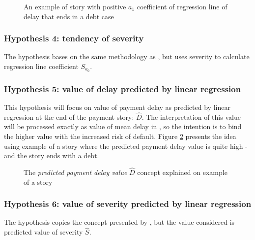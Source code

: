 \documentclass{article}
\begin{document}
\begin{figure}[htbp!]
    \begin{center}
        
    \caption{An example of story with positive $a_1$ coefficient of regression line of delay that ends in a debt case}
    \label{fig:303_h3_tendency_coefficient_explained}
    \end{center}
\end{figure}

\subsubsection{Hypothesis 4: tendency of severity}

The hypothesis bases on the same methodology as , but uses severity to calculate regression line coefficient $S_{a_0}$.

\subsubsection{Hypothesis 5: value of delay predicted by linear regression}
\label{section:H5}

This hypothesis will focus on value of payment delay as predicted by linear regression at the end of the payment story: $\hat{D}$.
The interpretation of this value will be processed exactly as value of mean delay in ,
so the intention is to bind the higher value with the increased risk of default.
Figure \ref{fig:304_h5_tendency_value_explained} presents the idea using example of a story where the predicted payment delay value is quite high - and the story ends with a debt.

\begin{figure}[htbp!]
    \begin{center}
        
    \caption{The \textit{predicted payment delay value} $\hat{D}$ concept explained on example of a story}
    \label{fig:304_h5_tendency_value_explained}
    \end{center}
\end{figure}


\subsubsection{Hypothesis 6: value of severity predicted by linear regression}

The hypothesis copies the concept presented by , but the value considered is predicted value of severity $\hat{S}$.
\end{document}
